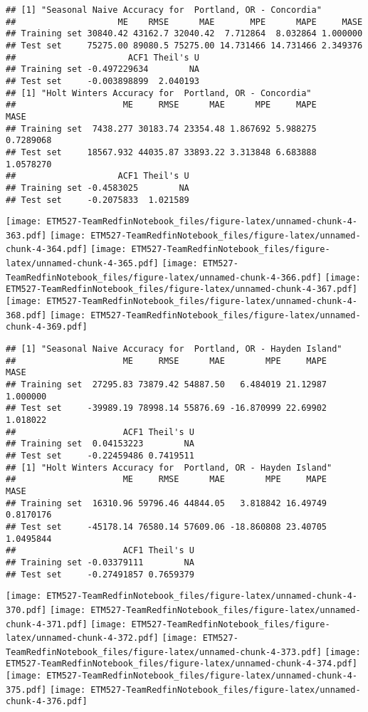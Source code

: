 \documentclass[]{article}
\begin{document}
\begin{verbatim}
## [1] "Seasonal Naive Accuracy for  Portland, OR - Concordia"
##                    ME    RMSE      MAE       MPE      MAPE     MASE
## Training set 30840.42 43162.7 32040.42  7.712864  8.032864 1.000000
## Test set     75275.00 89080.5 75275.00 14.731466 14.731466 2.349376
##                      ACF1 Theil's U
## Training set -0.497229634        NA
## Test set     -0.003898899  2.040193
## [1] "Holt Winters Accuracy for  Portland, OR - Concordia"
##                     ME     RMSE      MAE      MPE     MAPE      MASE
## Training set  7438.277 30183.74 23354.48 1.867692 5.988275 0.7289068
## Test set     18567.932 44035.87 33893.22 3.313848 6.683888 1.0578270
##                    ACF1 Theil's U
## Training set -0.4583025        NA
## Test set     -0.2075833  1.021589
\end{verbatim}

\texttt{[image: ETM527-TeamRedfinNotebook\_files/figure-latex/unnamed-chunk-4-363.pdf]}
\texttt{[image: ETM527-TeamRedfinNotebook\_files/figure-latex/unnamed-chunk-4-364.pdf]}
\texttt{[image: ETM527-TeamRedfinNotebook\_files/figure-latex/unnamed-chunk-4-365.pdf]}
\texttt{[image: ETM527-TeamRedfinNotebook\_files/figure-latex/unnamed-chunk-4-366.pdf]}
\texttt{[image: ETM527-TeamRedfinNotebook\_files/figure-latex/unnamed-chunk-4-367.pdf]}
\texttt{[image: ETM527-TeamRedfinNotebook\_files/figure-latex/unnamed-chunk-4-368.pdf]}
\texttt{[image: ETM527-TeamRedfinNotebook\_files/figure-latex/unnamed-chunk-4-369.pdf]}

\begin{verbatim}
## [1] "Seasonal Naive Accuracy for  Portland, OR - Hayden Island"
##                     ME     RMSE      MAE        MPE     MAPE     MASE
## Training set  27295.83 73879.42 54887.50   6.484019 21.12987 1.000000
## Test set     -39989.19 78998.14 55876.69 -16.870999 22.69902 1.018022
##                     ACF1 Theil's U
## Training set  0.04153223        NA
## Test set     -0.22459486 0.7419511
## [1] "Holt Winters Accuracy for  Portland, OR - Hayden Island"
##                     ME     RMSE      MAE        MPE     MAPE      MASE
## Training set  16310.96 59796.46 44844.05   3.818842 16.49749 0.8170176
## Test set     -45178.14 76580.14 57609.06 -18.860808 23.40705 1.0495844
##                     ACF1 Theil's U
## Training set -0.03379111        NA
## Test set     -0.27491857 0.7659379
\end{verbatim}

\texttt{[image: ETM527-TeamRedfinNotebook\_files/figure-latex/unnamed-chunk-4-370.pdf]}
\texttt{[image: ETM527-TeamRedfinNotebook\_files/figure-latex/unnamed-chunk-4-371.pdf]}
\texttt{[image: ETM527-TeamRedfinNotebook\_files/figure-latex/unnamed-chunk-4-372.pdf]}
\texttt{[image: ETM527-TeamRedfinNotebook\_files/figure-latex/unnamed-chunk-4-373.pdf]}
\texttt{[image: ETM527-TeamRedfinNotebook\_files/figure-latex/unnamed-chunk-4-374.pdf]}
\texttt{[image: ETM527-TeamRedfinNotebook\_files/figure-latex/unnamed-chunk-4-375.pdf]}
\texttt{[image: ETM527-TeamRedfinNotebook\_files/figure-latex/unnamed-chunk-4-376.pdf]}
\end{document}
